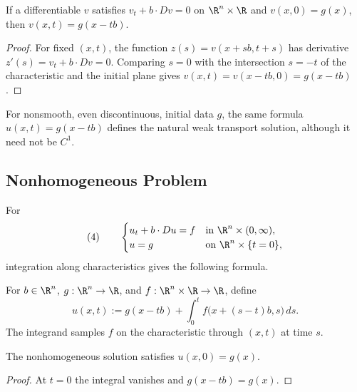 \begin{theorem}
\label{thm:transport-ivp-uniqueness}
\leanok
If a differentiable $v$ satisfies $v_t+b\cdot Dv=0$ on $\R^n\times\R$ and
$v(x,0)=g(x)$, then $v(x,t)=g(x-tb)$.
\end{theorem}
\begin{proof}
\leanok
\sketch For fixed $(x,t)$, the function
$z(s)=v(x+sb,t+s)$ has derivative $z'(s)=v_t+b\cdot Dv=0$. Comparing $s=0$
with the intersection $s=-t$ of the characteristic and the initial plane gives
$v(x,t)=v(x-tb,0)=g(x-tb)$.
\end{proof}

\begin{remark}
\label{rem:transport-equation-weak-solution-discontinuous-data}
For nonsmooth, even discontinuous, initial data $g$, the same formula
$u(x,t)=g(x-tb)$ defines the natural weak transport solution, although it need
not be $C^1$.
\end{remark}

\subsection{Nonhomogeneous Problem}
\label{sec:transport-equation-nonhomogeneous-problem}

For
$$(4)\qquad
\begin{cases}
u_t+b\cdot Du=f&\text{in }\R^n\times(0,\infty),\\
u=g&\text{on }\R^n\times\{t=0\},
\end{cases}$$
integration along characteristics gives the following formula.

\begin{definition}
\label{def:transport-nonhom-solution}
\leanok
For $b\in\R^n$, $g:\R^n\to\R$, and $f:\R^n\times\R\to\R$, define
$$u(x,t):=g(x-tb)+\int_0^t f\bigl(x+(s-t)b,s\bigr)\,ds.$$
The integrand samples $f$ on the characteristic through $(x,t)$ at time $s$.
\end{definition}

\begin{theorem}
\label{thm:transport-nonhom-initial-condition}
\leanok
The nonhomogeneous solution satisfies $u(x,0)=g(x)$.
\end{theorem}
\begin{proof}
\leanok
\sketch At $t=0$ the integral vanishes and $g(x-tb)=g(x)$.
\end{proof}

